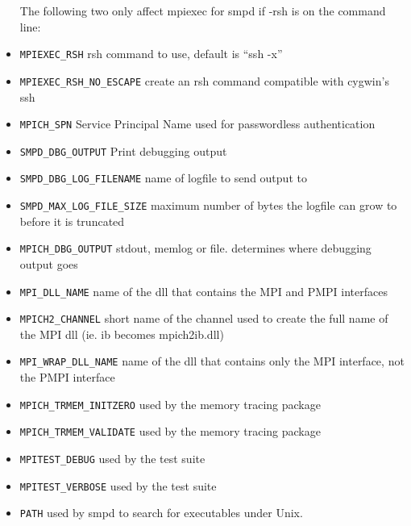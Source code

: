 \documentclass[dvipdfm,11pt]{article}
\begin{document}
\begin{itemize}
The following two only affect mpiexec for smpd if -rsh is on the command line:
\item \texttt{MPIEXEC\_RSH}
rsh command to use, default is ``ssh -x''
\item \texttt{MPIEXEC\_RSH\_NO\_ESCAPE}
create an rsh command compatible with cygwin's ssh
\item \texttt{MPICH\_SPN}
Service Principal Name used for passwordless authentication
\item \texttt{SMPD\_DBG\_OUTPUT}
Print debugging output
\item \texttt{SMPD\_DBG\_LOG\_FILENAME}
name of logfile to send output to
\item \texttt{SMPD\_MAX\_LOG\_FILE\_SIZE}
maximum number of bytes the logfile can grow to before it is truncated
\item \texttt{MPICH\_DBG\_OUTPUT}
stdout, memlog or file.  determines where debugging output goes
\item \texttt{MPI\_DLL\_NAME}
name of the dll that contains the MPI and PMPI interfaces
\item \texttt{MPICH2\_CHANNEL}
short name of the channel used to create the full name of the MPI dll (ie. ib becomes mpich2ib.dll)
\item \texttt{MPI\_WRAP\_DLL\_NAME}
name of the dll that contains only the MPI interface, not the PMPI interface
\item \texttt{MPICH\_TRMEM\_INITZERO}
used by the memory tracing package
\item \texttt{MPICH\_TRMEM\_VALIDATE}
used by the memory tracing package
\item \texttt{MPITEST\_DEBUG}
used by the test suite
\item \texttt{MPITEST\_VERBOSE}
used by the test suite
\item \texttt{PATH}
used by smpd to search for executables under Unix.
\end{itemize}
\end{document}
